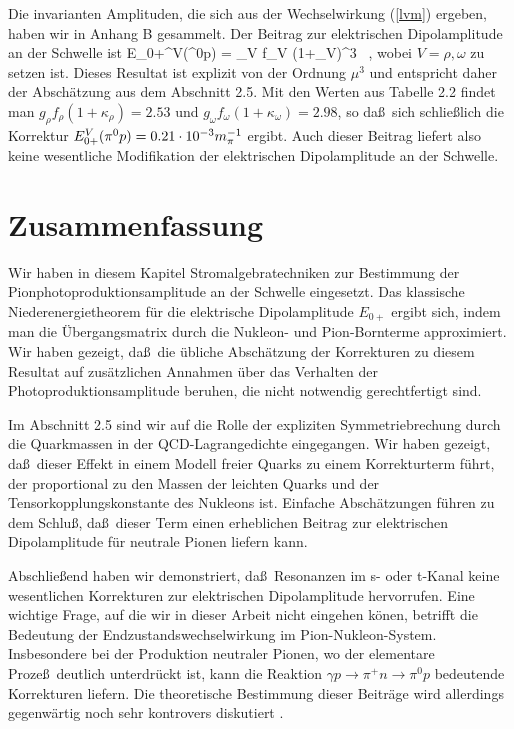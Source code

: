 Die invarianten Amplituden, die sich aus der Wechselwirkung (\ref{lvm})
ergeben, haben wir in Anhang B gesammelt. Der Beitrag zur
elektrischen Dipolamplitude an der Schwelle ist
\be
  E_{0+}^V(\pi^0p) =  \sum_V 
    f_V (1+\kappa_V)\mu^3
     \, ,
\ee     	 
wobei $V=\rho,\omega$ zu setzen ist. Dieses Resultat ist explizit
von der Ordnung $\mu^3$ und entspricht daher der Absch\"atzung
aus dem Abschnitt 2.5. Mit den Werten aus Tabelle 2.2 findet man 
$g_\rho f_\rho (1+\kappa_\rho)=2.53$ und  $g_\omega f_\omega 
(1+\kappa_\omega)=2.98$, so da\ss\ sich schlie\ss lich die 
Korrektur $E_{0+}^V(\pi^0p)=0.21\cdot 10^{-3} m_\pi^{-1}$ ergibt. Auch dieser Beitrag 
liefert also keine wesentliche Modifikation der elektrischen 
Dipolamplitude an der Schwelle.  
 
\section{Zusammenfassung}
Wir haben in diesem Kapitel Stromalgebratechniken zur Bestimmung der 
Pionphotoproduktionsamplitude an der Schwelle eingesetzt. Das klassische
Niederenergietheorem f\"ur die elektrische Dipolamplitude $E_{0+}$
ergibt sich, indem man die \"Ubergangsmatrix durch die Nukleon- und
Pion-Bornterme approximiert. Wir haben gezeigt, da\ss\ die \"ubliche 
Absch\"atzung der Korrekturen zu diesem Resultat auf zus\"atzlichen 
Annahmen \"uber das Verhalten der Photoproduktionsamplitude beruhen, 
die nicht notwendig gerechtfertigt sind. 

Im Abschnitt 2.5 sind wir auf die Rolle der expliziten Symmetriebrechung
durch die Quarkmassen in der QCD-Lagrangedichte eingegangen. Wir haben 
gezeigt, da\ss\ dieser Effekt in einem Modell freier Quarks zu einem 
Korrekturterm f\"uhrt, der proportional zu den Massen der leichten 
Quarks und der Tensorkopplungskonstante des Nukleons ist. Einfache 
Absch\"atzungen f\"uhren zu dem Schlu\ss , da\ss\ dieser Term einen 
erheblichen Beitrag zur elektrischen Dipolamplitude f\"ur neutrale Pionen 
liefern kann.

Abschlie\ss end haben wir demonstriert, da\ss\ Resonanzen im s- oder 
t-Kanal keine wesentlichen Korrekturen zur elektrischen Dipolamplitude
hervorrufen. Eine wichtige Frage, auf die wir in dieser Arbeit nicht 
eingehen k\"onen, betrifft die Bedeutung der Endzustandswechselwirkung 
im Pion-Nukleon-System. Insbesondere bei der Produktion neutraler Pionen,
wo der elementare Proze\ss\ deutlich unterdr\"uckt ist, kann die Reaktion
$\gamma p\to \pi^+n\to\pi^0p$ bedeutende Korrekturen liefern. Die 
theoretische Bestimmung dieser Beitr\"age wird allerdings gegenw\"artig 
noch sehr kontrovers diskutiert \cite{DT91,Kam89,NLB90,LYL91,Ber91,BKG91}.
